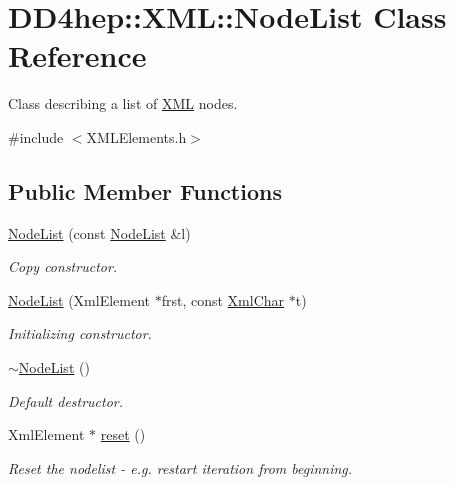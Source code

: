 \hypertarget{class_d_d4hep_1_1_x_m_l_1_1_node_list}{
\section{DD4hep::XML::NodeList Class Reference}
\label{class_d_d4hep_1_1_x_m_l_1_1_node_list}
}


Class describing a list of \hyperlink{namespace_d_d4hep_1_1_x_m_l}{XML} nodes.  


{\ttfamily \#include $<$XMLElements.h$>$}\subsection*{Public Member Functions}
\begin{DoxyCompactItemize}
\item 
\hyperlink{class_d_d4hep_1_1_x_m_l_1_1_node_list_a26cb6e55d1caaceb8753eb05280a7e46}{NodeList} (const \hyperlink{class_d_d4hep_1_1_x_m_l_1_1_node_list}{NodeList} \&l)
\begin{DoxyCompactList}\small\item\em Copy constructor. \item\end{DoxyCompactList}\item 
\hyperlink{class_d_d4hep_1_1_x_m_l_1_1_node_list_a8711c5612f382425754b2b8d7b01a7dc}{NodeList} (XmlElement $\ast$frst, const \hyperlink{namespace_d_d4hep_1_1_x_m_l_a09e5d9cc86ed782f6826dfe0778c1815}{XmlChar} $\ast$t)
\begin{DoxyCompactList}\small\item\em Initializing constructor. \item\end{DoxyCompactList}\item 
\hyperlink{class_d_d4hep_1_1_x_m_l_1_1_node_list_a77b664c0c6c93d1c6eccbd10581396af}{$\sim$NodeList} ()
\begin{DoxyCompactList}\small\item\em Default destructor. \item\end{DoxyCompactList}\item 
XmlElement $\ast$ \hyperlink{class_d_d4hep_1_1_x_m_l_1_1_node_list_ac1d472d2a7418c4dadf545044143901d}{reset} ()
\begin{DoxyCompactList}\small\item\em Reset the nodelist -\/ e.g. restart iteration from beginning. \item\end{DoxyCompactList}\item 

\end{DoxyCompactItemize}
